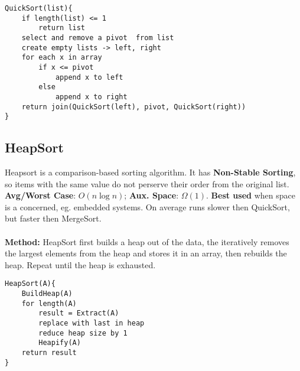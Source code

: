\documentclass{article}
\begin{document}
\begin{lstlisting}[style=pseudo]
QuickSort(list){
	if length(list) <= 1
		return list
	select and remove a pivot  from list
	create empty lists -> left, right
	for each x in array
		if x <= pivot
			append x to left
		else
			append x to right
	return join(QuickSort(left), pivot, QuickSort(right))
}
\end{lstlisting}



\subsection{HeapSort}

Heapsort is a comparison-based sorting algorithm. It has {\bf Non-Stable Sorting}, so items with the same value do not perserve their order from the original list. {\bf Avg/Worst Case}: $O(n \log n)$; {\bf Aux. Space}: $\Omega(1)$. {\bf Best used} when space is a concerned, eg. embedded systems. On average runs slower then QuickSort, but faster then MergeSort.
\\ \\
{\bf Method:} HeapSort first builds a heap out of the data, the iteratively removes the largest elements from the heap and stores it in an array, then rebuilds the heap. Repeat until the heap is exhausted.
\begin{lstlisting}[style=pseudo]
HeapSort(A){
	BuildHeap(A)
	for length(A)
		result = Extract(A)
		replace with last in heap
		reduce heap size by 1
		Heapify(A)
	return result
}
\end{lstlisting}
\end{document}
